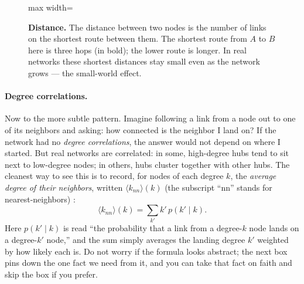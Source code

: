 \begin{figure}[t]
\centering
\begin{adjustbox}{max width=\linewidth}\end{adjustbox}
\caption{\textbf{Distance.} The distance between two nodes is the number of links
on the shortest route between them. The shortest route from $A$ to $B$ here is
three hops (in bold); the lower route is longer. In real networks these shortest
distances stay small even as the network grows --- the small-world
effect.}
\label{fig:intro-distance}
\end{figure}

\paragraph{Degree correlations.}
Now to the more subtle pattern. Imagine following a link from a node out to one
of its neighbors and asking: how connected is the neighbor I land on? If the
network had no \emph{degree correlations}, the answer would not depend on where I
started. But real networks are correlated: in some, high-degree hubs tend to sit
next to low-degree nodes; in others, hubs cluster together with other hubs. The
cleanest way to see this is to record, for nodes of each degree $k$, the
\emph{average degree of their neighbors}, written $\langle k_{nn}\rangle(k)$ (the
subscript ``nn'' stands for nearest-neighbors) \citep{pastorsatorras2001}:
\begin{equation}
  \langle k_{nn} \rangle(k) = \sum_{k'} k'\, p(k' \mid k).
  \label{eq:intro-knn}
\end{equation}
Here $p(k' \mid k)$ is read ``the probability that a link from a degree-$k$ node
lands on a degree-$k'$ node,'' and the sum simply averages the landing degree
$k'$ weighted by how likely each is. Do not worry if the formula looks abstract;
the next box pins down the one fact we need from it, and you can take that fact
on faith and skip the box if you prefer.


